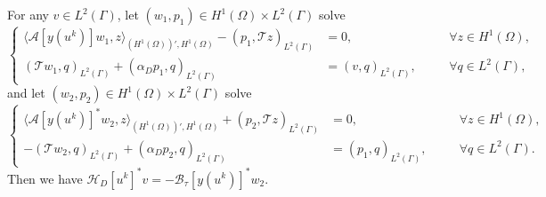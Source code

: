 \documentclass[onefignum,onetabnum]{siamart190516}
\numberwithin{equation}{section}
\begin{document}
\begin{lemma}\label{lemma2}
For any $v\in L^{2}(\Gamma)$, let $(w_{1}, p_{1}) \in H^{1}(\Omega) \times L^{2}(\Gamma)$ solve
\begin{equation}\label{eqn29}
\left\{
\begin{aligned}
\langle \mathcal{A}[y(u^{k})] w_{1}, z \rangle_{(H^{1}(\Omega))', H^{1}(\Omega)} - (p_{1}, \mathcal{T} z)_{L^{2}(\Gamma)} &= 0, \quad &&\forall z \in H^{1}(\Omega), \\
(\mathcal{T} w_{1}, q)_{L^{2}(\Gamma)} + (\alpha_{D} p_{1}, q)_{L^{2}(\Gamma)} &= (v, q)_{L^{2}(\Gamma)}, \quad &&\forall q \in L^{2}(\Gamma),
\end{aligned}
\right.
\end{equation}
and let $(w_{2}, p_{2}) \in H^{1}(\Omega) \times L^{2}(\Gamma)$ solve
\begin{equation}\label{eqn27}
\left\{
\begin{aligned}
\langle \mathcal{A}[y(u^{k})]^{*} w_{2}, z \rangle_{(H^{1}(\Omega))', H^{1}(\Omega)} + (p_{2}, \mathcal{T} z)_{L^{2}(\Gamma)} &= 0, \quad &&\forall z \in H^{1}(\Omega), \\
-(\mathcal{T} w_{2}, q)_{L^{2}(\Gamma)} + (\alpha_{D} p_{2}, q)_{L^{2}(\Gamma)} &= (p_{1}, q)_{L^{2}(\Gamma)}, \quad &&\forall q \in L^{2}(\Gamma).
\end{aligned}
\right.
\end{equation}
Then we have $\mathcal{H}_{D}[u^{k}]^{*} v=-\mathcal{B}_{\tau}[y(u^{k})]^{*} w_{2}$.
\end{lemma}
\end{document}
